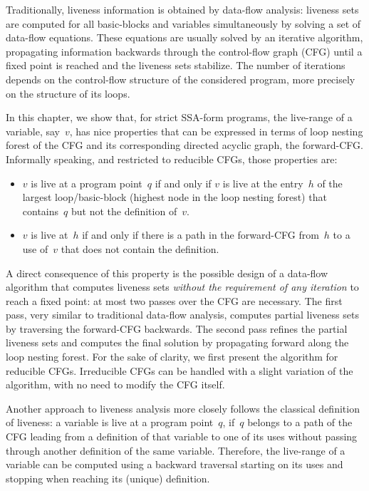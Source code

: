 
Traditionally, liveness information is obtained by data-flow analysis:
liveness sets are computed for all basic-blocks and variables simultaneously by solving a set of data-flow equations.
These equations are usually solved by an iterative algorithm, propagating information backwards through the control-flow graph (CFG) until a fixed point is reached and the liveness sets stabilize.
The number of iterations depends on the control-flow structure of the considered program, more precisely on the structure of its loops.

In this chapter, we show that, for strict SSA-form programs, the live-range of a variable, say~$v$, has nice properties that can be expressed in terms of loop nesting forest of the CFG and its corresponding directed acyclic graph, the forward-CFG.
Informally speaking, and restricted to reducible CFGs, those properties are:
\begin{itemize}
\item
	$v$ is live at a program point~$q$ if and only if $v$ is live at the entry~$h$ of the largest loop/basic-block (highest node in the loop nesting forest) that contains~$q$ but not the definition of~$v$.
\item
	$v$ is live at~$h$ if and only if there is a path in the forward-CFG from~$h$ to a use of~$v$ that does not contain the definition.
\end{itemize}


A direct consequence of this property is the possible design of a data-flow algorithm that computes liveness sets \emph{without the requirement of any iteration} to reach a fixed point:
at most two passes over the CFG are necessary.
The first pass, very similar to traditional data-flow analysis, computes partial liveness sets by traversing the forward-CFG backwards.
The second pass refines the partial liveness sets and computes the final solution by propagating forward along the loop nesting forest.
For the sake of clarity, we first present the algorithm for reducible CFGs.
Irreducible CFGs can be handled with a slight variation of the algorithm, with no need to modify the CFG itself.

Another approach to liveness analysis more closely follows the classical definition of liveness:
a variable is live at a program point~$q$, if~$q$ belongs to a path of the CFG leading from a definition of that variable to one of its uses without passing through another definition of the same variable.
Therefore, the live-range of a variable can be computed using a backward traversal starting on its uses and stopping when reaching its (unique) definition.

